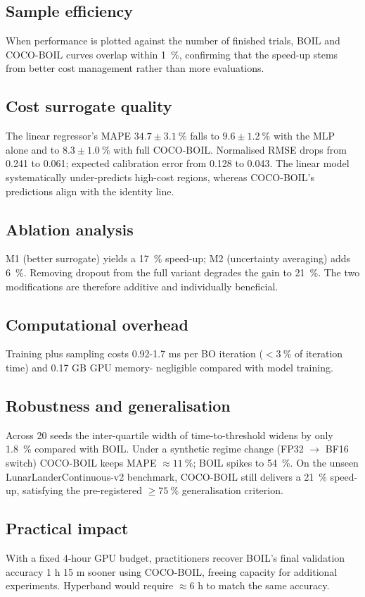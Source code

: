 \documentclass{article}
\begin{document}
\subsection{Sample efficiency}
When performance is plotted against the number of finished trials, BOIL and COCO-BOIL curves overlap within 1\ \%, confirming that the speed-up stems from better cost management rather than more evaluations.

\subsection{Cost surrogate quality}
The linear regressor's MAPE $34.7 \pm 3.1\ \%$ falls to $9.6 \pm 1.2\ \%$ with the MLP alone and to $8.3 \pm 1.0\ \%$ with full COCO-BOIL. Normalised RMSE drops from 0.241 to 0.061; expected calibration error from 0.128 to 0.043. The linear model systematically under-predicts high-cost regions, whereas COCO-BOIL's predictions align with the identity line.

\subsection{Ablation analysis}
M1 (better surrogate) yields a 17\ \% speed-up; M2 (uncertainty averaging) adds 6\ \%. Removing dropout from the full variant degrades the gain to 21\ \%. The two modifications are therefore additive and individually beneficial.

\subsection{Computational overhead}
Training plus sampling costs 0.92-1.7 ms per BO iteration ($<3\ \%$ of iteration time) and 0.17 GB GPU memory- negligible compared with model training.

\subsection{Robustness and generalisation}
Across 20 seeds the inter-quartile width of time-to-threshold widens by only 1.8\ \% compared with BOIL. Under a synthetic regime change (FP32 $\to$ BF16 switch) COCO-BOIL keeps MAPE $\approx 11\ \%$; BOIL spikes to 54\ \%. On the unseen LunarLanderContinuous-v2 benchmark, COCO-BOIL still delivers a 21\ \% speed-up, satisfying the pre-registered $\ge 75\ \%$ generalisation criterion.

\subsection{Practical impact}
With a fixed 4-hour GPU budget, practitioners recover BOIL's final validation accuracy 1 h 15 m sooner using COCO-BOIL, freeing capacity for additional experiments. Hyperband would require $\approx 6$ h to match the same accuracy.
\end{document}

